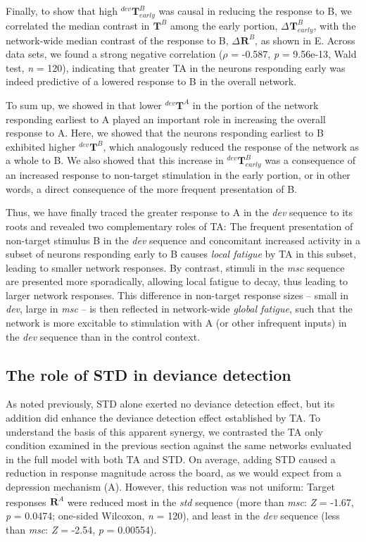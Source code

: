 \documentclass[9pt,lineno,onehalfspacing]{elife}
\newcommand{\dev}{\textit{dev}}
\newcommand{\msc}{\textit{msc}}
\newcommand{\std}{\textit{std}}
\newcommand{\R}[3][]{{}^{#1}_{}\boldsymbol R^{#2}_{#3}}
\newcommand{\T}[3][]{{}^{#1}_{}\boldsymbol T^{#2}_{#3}}
\newcommand{\mean}[1]{\overline{#1}}
\begin{document}
Finally, to show that high $\T[dev]{B}{early}$ was causal in reducing the response to B, we correlated the median contrast in $\T{B}{}$ among the early portion, $\Delta \T{B}{early}$, with the network-wide median contrast of the response to B, $\Delta \R{B}{}$, as shown in E. Across data sets, we found a strong negative correlation ($\rho$ = -0.587, \textit{p} = 9.56e-13, Wald test, \textit{n} = 120), indicating that greater TA in the neurons responding early was indeed predictive of a lowered response to B in the overall network.

To sum up, we showed in  that lower $\T[dev]{A}{}$ in the portion of the network responding earliest to A played an important role in increasing the overall response to A. Here, we showed that the neurons responding earliest to B exhibited higher $\T[dev]{B}{}$, which analogously reduced the response of the network as a whole to B. We also showed that this increase in $\T[dev]{B}{early}$ was a consequence of an increased response to non-target stimulation in the early portion, or in other words, a direct consequence of the more frequent presentation of B.

Thus, we have finally traced the greater response to A in the \dev{} sequence to its roots and revealed two complementary roles of TA: The frequent presentation of non-target stimulus B in the \dev{} sequence and concomitant increased activity in a subset of neurons responding early to B causes \emph{local fatigue} by TA in this subset, leading to smaller network responses. By contrast, stimuli in the \msc{} sequence are presented more sporadically, allowing local fatigue to decay, thus leading to larger network responses. This difference in non-target response sizes -- small in \dev{}, large in \msc{} -- is then reflected in network-wide \emph{global fatigue}, such that the network is more excitable to stimulation with A (or other infrequent inputs) in the \dev{} sequence than in the control context.

\subsection{The role of STD in deviance detection}\label{sec:std}

As noted previously, STD alone exerted no deviance detection effect, but its addition did enhance the deviance detection effect established by TA. To understand the basis of this apparent synergy, we contrasted the TA only condition examined in the previous section against the same networks evaluated in the full model with both TA and STD. On average, adding STD caused a reduction in response magnitude across the board, as we would expect from a depression mechanism (A). However, this reduction was not uniform: Target responses $\mean{\R{A}{}}$ were reduced most in the \std{} sequence (more than \msc{}: \textit{Z} = -1.67, \textit{p} = 0.0474; one-sided Wilcoxon, \textit{n} = 120), and least in the \dev{} sequence (less than \msc{}: \textit{Z} = -2.54, \textit{p} = 0.00554).
\end{document}
